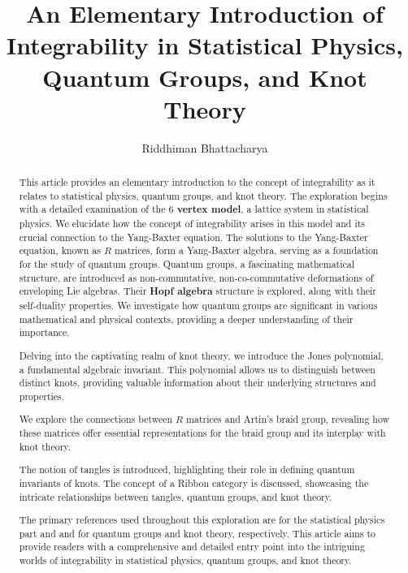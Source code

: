 \documentclass[11pt]{article}
\title{\textbf{An Elementary Introduction of Integrability in Statistical Physics, Quantum Groups, and Knot Theory} }
\author{Riddhiman Bhattacharya}
\date{}
\theoremstyle{definition}
\begin{document}
\maketitle
\begin{abstract}
    \small This article provides an elementary introduction to the concept of integrability as it relates to statistical physics, quantum groups, and knot theory. The exploration begins with a detailed examination of the \textbf{$6$ vertex model}, a lattice system in statistical physics. We elucidate how the concept of integrability arises in this model and its crucial connection to the Yang-Baxter equation. The solutions to the Yang-Baxter equation, known as $R$ matrices, form a Yang-Baxter algebra, serving as a foundation for the study of quantum groups.
Quantum groups, a fascinating mathematical structure, are introduced as non-commutative, non-co-commutative deformations of enveloping Lie algebras. Their \textbf{Hopf algebra} structure is explored, along with their self-duality properties. We investigate how quantum groups are significant in various mathematical and physical contexts, providing a deeper understanding of their importance.

Delving into the captivating realm of knot theory, we introduce the Jones polynomial, a fundamental algebraic invariant. This polynomial allows us to distinguish between distinct knots, providing valuable information about their underlying structures and properties.

We explore the connections between $R$ matrices and Artin's braid group, revealing how these matrices offer essential representations for the braid group and its interplay with knot theory.

The notion of tangles is introduced, highlighting their role in defining quantum invariants of knots. The concept of a Ribbon category is discussed, showcasing the intricate relationships between tangles, quantum groups, and knot theory.

The primary references used throughout this exploration are \cite{GomezRuizSierra} for the statistical physics part and \cite{Kassel} and \cite{KasRossTur} for quantum groups and knot theory, respectively. This article aims to provide readers with a comprehensive and detailed entry point into the intriguing worlds of integrability in statistical physics, quantum groups, and knot theory. 
\end{abstract}
\pagebreak
\tableofcontents
\pagebreak
\large
\end{document}
